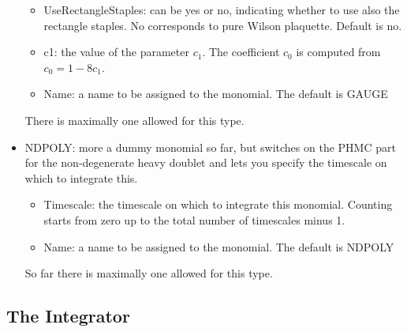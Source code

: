 \begin{itemize}
\begin{itemize}
  \item {\ttfamily UseRectangleStaples}: can be yes or no, indicating
    whether to use also the rectangle staples. No corresponds to pure
    Wilson plaquette. Default is no.
  \item {\ttfamily c1}: the value of the parameter $c_1$. The
    coefficient $c_0$ is computed from $c_0 = 1-8c_1$.
  \item {\ttfamily Name}: a name to be assigned to the monomial. The
    default is {\ttfamily GAUGE}
  \end{itemize}
  There is maximally one allowed for this type.
\item {\ttfamily NDPOLY}: more a dummy monomial so far, but switches
  on the PHMC part for the non-degenerate heavy doublet and lets you
  specify the timescale on which to integrate this.
  \begin{itemize}
  \item {\ttfamily Timescale}: the timescale on which to integrate
    this monomial. Counting starts from zero up to the total number of
    timescales minus 1.
  \item {\ttfamily Name}: a name to be assigned to the monomial. The
    default is {\ttfamily NDPOLY}
  \end{itemize}
  So far there is maximally one allowed for this type.
\end{itemize}

\subsection{The Integrator}


